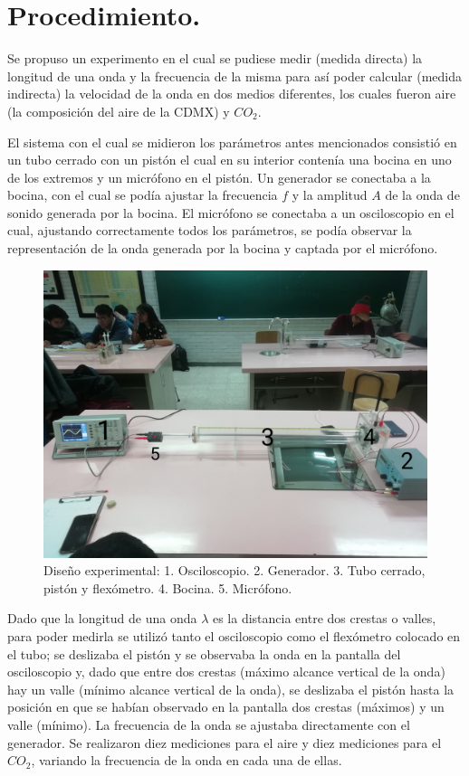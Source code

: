 \documentclass[10pt,a4paper]{article}
\begin{document}
\section{Procedimiento.}
Se propuso un experimento en el cual se pudiese medir (medida directa) la longitud de una onda y la frecuencia de la misma para así poder calcular (medida indirecta) la velocidad de la onda en dos medios diferentes, los cuales fueron aire (la composición del aire de la CDMX) y $CO_2$.  

El sistema con el cual se midieron los parámetros antes mencionados consistió en un tubo cerrado con un pistón el cual en su interior contenía una bocina en uno de los extremos y un micrófono en el pistón. Un generador se conectaba a la bocina, con el cual se podía ajustar la frecuencia $f$ y la amplitud $A$ de la onda de sonido generada por la bocina. El micrófono se conectaba a un osciloscopio en el cual, ajustando correctamente todos los parámetros, se podía observar la representación de la onda generada por la bocina y captada por el micrófono. 

\begin{figure}[H]
\includegraphics[scale=0.08]{esquema.jpg}
\centering
\caption{Diseño experimental: 1. Osciloscopio. 2. Generador. 3. Tubo cerrado, pistón y flexómetro. 4. Bocina. 5. Micrófono. }
\end{figure}

Dado que la longitud de una onda $\lambda$ es la distancia entre dos crestas o valles, para poder medirla se utilizó tanto el osciloscopio como el flexómetro colocado en el tubo; se deslizaba el pistón y se observaba la onda en la pantalla del osciloscopio y, dado que entre dos crestas (máximo alcance vertical de la onda) hay un valle (mínimo alcance vertical de la onda), se deslizaba el pistón hasta la posición en que se habían observado en la pantalla dos crestas (máximos) y un valle (mínimo). 
La frecuencia de la onda se ajustaba directamente con el generador. 
Se realizaron diez mediciones para el aire y diez mediciones para el $CO_2$, variando la frecuencia de la onda en cada una de ellas.  
\end{document}
